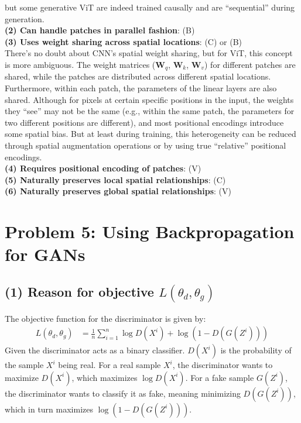 \documentclass[11pt, a4paper, oneside]{memoir}
\begin{document}
\begin{enumerate}[itemsep=1em]
            but some generative ViT are indeed trained causally and are ``sequential'' during generation. \\
        \textbf{(2) Can handle patches in parallel fashion}: (B) \\
        \textbf{(3) Uses weight sharing across spatial locations}: (C) or (B) \\
            There's no doubt about CNN's spatial weight sharing, but for ViT, this concept is more ambiguous.
            The weight matrices ($\mathbf{W}_q$, $\mathbf{W}_k$, $\mathbf{W}_v$) for different patches are shared,
            while the patches are distributed across different spatial locations.
            Furthermore, within each patch, the parameters of the linear layers are also shared.
            Although for pixels at certain specific positions in the input,
            the weights they ``see'' may not be the same (e.g., within the same patch, the parameters for two different positions are different),
            and most positional encodings introduce some spatial bias. But at least during training, this heterogeneity can be reduced through spatial augmentation operations
            or by using true ``relative'' positional encodings. \\
        \textbf{(4) Requires positional encoding of patches}: (V) \\
        \textbf{(5) Naturally preserves local spatial relationships}: (C) \\
        \textbf{(6) Naturally preserves global spatial relationships}: (V) \\
\end{enumerate}

\chapter{Problem 5: Using Backpropagation for GANs}
\section*{(1) Reason for objective $L(\theta_d, \theta_g)$}
The objective function for the discriminator is given by:
\begin{align*}
L (\theta_d, \theta_g) &= \frac{1}{n}\sum_{i=1}^{n} \log D(X^i) + \log \left( 1 - D(G(Z^i)) \right)
\end{align*}
Given the discriminator acts as a binary classifier. $D(X^i)$ is the probability of the sample $X^i$ being real.
For a real sample $X^i$, the discriminator wants to maximize $D(X^i)$, which maximizes $\log D(X^i)$.
For a fake sample $G(Z^i)$, the discriminator wants to classify it as fake, meaning minimizing $D(G(Z^i))$, which in turn maximizes $\log (1 - D(G(Z^i)))$.
\end{document}
